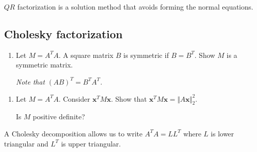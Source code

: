 \documentclass[12pt,letterpaper,noanswers]{exam}
\begin{document}
\begin{tcolorbox}
    $QR$ factorization is a solution method that avoids forming the normal equations.
\end{tcolorbox}

\subsection{Cholesky factorization}


\begin{enumerate}[resume]
\item Let $M = A^TA$.  A square matrix $B$ is symmetric if $B = B^T$.  Show $M$ is a symmetric matrix.

\emph{Note that $(AB)^T = B^TA^T$.}

\end{enumerate}

\vspace{0.8in}



\begin{enumerate}[resume]
\item Let $M = A^TA$. Consider $\mathbf{x}^TM\mathbf{x}$.  Show that $\mathbf{x}^TM\mathbf{x} = \Vert A\mathbf{x}\Vert_2^2$.  

Is $M$ positive definite?
\end{enumerate}
\vspace{0.8in}


A Cholesky decomposition allows us to write $A^TA = LL^T$ where $L$ is lower triangular and $L^T$ is upper triangular.  
\end{document}
